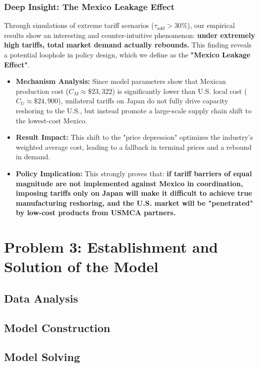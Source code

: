 \documentclass{apmcmthesis}
\begin{document}
\subsubsection{Deep Insight: The Mexico Leakage Effect}
Through simulations of extreme tariff scenarios ($\tau_{add} > 30\%$), our empirical results show an interesting and counter-intuitive phenomenon: \textbf{under extremely high tariffs, total market demand actually rebounds.} This finding reveals a potential loophole in policy design, which we define as the \textbf{"Mexico Leakage Effect"}.

\begin{itemize}
    \item \textbf{Mechanism Analysis:} Since model parameters show that Mexican production cost ($C_M \approx \$23,322$) is significantly lower than U.S. local cost ($C_U \approx \$24,900$), unilateral tariffs on Japan do not fully drive capacity reshoring to the U.S., but instead promote a large-scale supply chain shift to the lowest-cost Mexico.
    \item \textbf{Result Impact:} This shift to the "price depression" optimizes the industry's weighted average cost, leading to a fallback in terminal prices and a rebound in demand.
    \item \textbf{Policy Implication:} This strongly proves that: \textbf{if tariff barriers of equal magnitude are not implemented against Mexico in coordination, imposing tariffs only on Japan will make it difficult to achieve true manufacturing reshoring, and the U.S. market will be "penetrated" by low-cost products from USMCA partners.}
\end{itemize}



\section{Problem 3: Establishment and Solution of the Model}
\subsection{Data Analysis}

\subsection{Model Construction}

\subsection{Model Solving}
\end{document}
